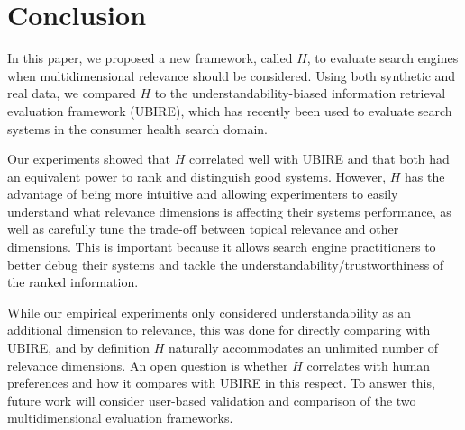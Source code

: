 
\section{Conclusion}
\label{sec:conclusion}

In this paper, we proposed a new framework, called $H$, to evaluate search engines when multidimensional relevance should be considered.
Using both synthetic and real data, we compared $H$ to the understandability-biased information retrieval evaluation framework (UBIRE), which has recently been used  to evaluate search systems in the consumer health search domain. 

Our experiments showed that $H$ correlated well with UBIRE and that both had an equivalent power to rank and distinguish good systems. However, $H$ has the advantage of being more intuitive and allowing experimenters to easily understand what relevance dimensions is affecting their systems performance, as well as carefully tune the trade-off between topical relevance and other dimensions. This is important because it allows search engine practitioners to better debug their systems and tackle the understandability/trustworthiness of the ranked information.

 While our empirical experiments only considered understandability as an additional dimension to relevance, this was done for directly comparing with UBIRE, and by definition $H$ naturally accommodates an unlimited number of relevance dimensions. An open question is whether $H$ correlates with human preferences and how it compares with UBIRE in this respect. To answer this, future work will consider user-based validation and comparison of the two multidimensional evaluation frameworks. 
